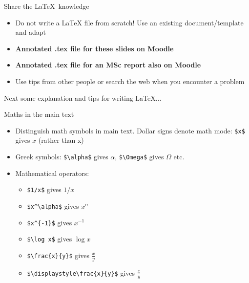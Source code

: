 \documentclass{beamer}             %
\begin{document}
\begin{frame}{Share the \LaTeX \ knowledge}
\begin{itemize}
\setlength{\itemsep}{.5cm}
\item Do not write a LaTeX file from scratch! Use an existing document/template and adapt
\item \alert{\bf Annotated .tex file for these slides on Moodle}
\item \alert{\bf Annotated .tex file for an MSc report also on Moodle}
\item Use tips from other people or search the web when you encounter a problem
\end{itemize}
\end{frame}

\begin{frame}
Next some explanation and tips for writing LaTeX...
\end{frame}


\begin{frame}[containsverbatim]{Maths in the main text}
\begin{itemize}
\setlength{\itemsep}{.5cm}
\item Distinguish math symbols in main text. Dollar signs denote math mode: \verb!$x$! gives $x$ (rather than x)
\item Greek symbols: \verb!$\alpha$! gives $\alpha$, \verb!$\Omega$! gives $\Omega$ etc.
\item Mathematical operators:
\begin{itemize}
\setlength{\itemsep}{.25cm}
\item \verb!$1/x$! gives $1/x$
\item \verb!$x^\alpha$! gives $x^\alpha$
\item \verb!$x^{-1}$! gives $x^{-1}$
\item \verb!$\log x$! gives $\log x$
\item \verb!$\frac{x}{y}$! gives $\frac{x}{y}$
\item \verb!$\displaystyle\frac{x}{y}$! gives $\displaystyle\frac{x}{y}$
\end{itemize}
\end{itemize}
\end{frame}
\end{document}

